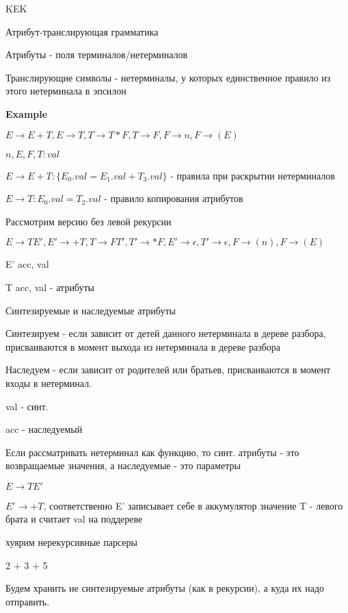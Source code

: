\begin{para}{KEK}

\begin{defe}{Атрибут-транслирующая грамматика}

Атрибуты - поля терминалов/нетерминалов

Транслирующие символы - нетерминалы, у которых единственное правило из этого нетерминала в эпсилон

\end{defe}

\textbf{Example}

$E \rightarrow E + T, E \rightarrow T, T \rightarrow T * F, T \rightarrow F, F \rightarrow n, F \rightarrow (E)$

$n, E, F, T : val$

$E \rightarrow E + T : \{ E_0.val = E_1.val + T_3.val \}$ - правила при раскрытии нетерминалов

$E \rightarrow T : E_0.val = T_2.val$ - правило копирования атрибутов

Рассмотрим версию без левой рекурсии

$E \rightarrow TE', E' \rightarrow +T, T \rightarrow FT', T' \rightarrow *F, E' \rightarrow \epsilon, T' \rightarrow \epsilon, F \rightarrow (n), F \rightarrow (E)$

E' acc, val

T acc, val - атрибуты

Синтезируемые и наследуемые атрибуты

Синтезируем - если зависит от детей данного нетерминала в дереве разбора, присваиваются в момент выхода из нетерминала в дереве разбора

Наследуем - если зависит от родителей или братьев, присваиваются в момент входы в нетерминал.

val - синт.

acc - наследуемый

Если рассматривать нетерминал как функцию, то синт. атрибуты - это возвращаемые значения, а наследуемые - это параметры

$E \rightarrow TE'$

$E' \rightarrow + T$, соответственно E' записывает себе в аккумулятор значение T - левого брата и считает val на поддереве

\end{para}

\begin{para}{хуярим нерекурсивные парсеры}

2 + 3 + 5

Будем хранить не синтезируемые атрибуты (как в рекурсии), а куда их надо отправить.

\end{para}






